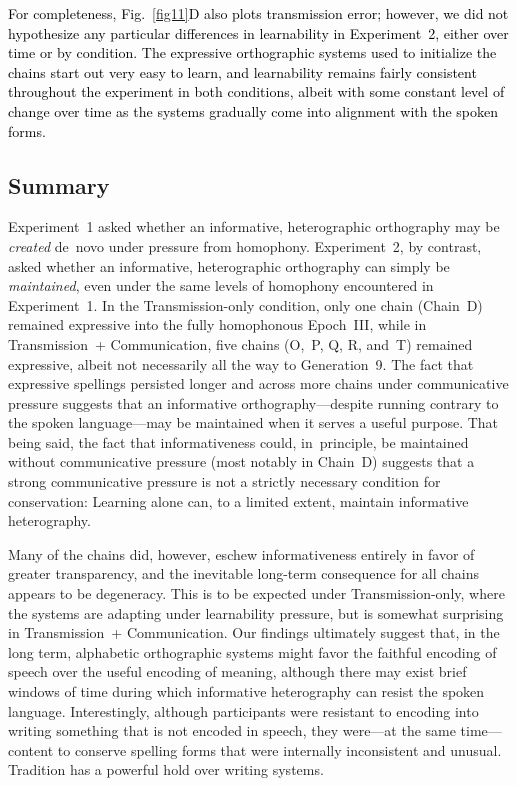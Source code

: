 \documentclass[doc,biblatex]{apa7}
\newcommand\firstrevision[1]{\textcolor{black}{#1}}
\begin{document}
\firstrevision{For completeness, Fig.~\ref{fig11}D also plots transmission error; however, we did not hypothesize any particular differences in learnability in Experiment~2, either over time or by condition. The expressive orthographic systems used to initialize the chains start out very easy to learn, and learnability remains fairly consistent throughout the experiment in both conditions, albeit with some constant level of change over time as the systems gradually come into alignment with the spoken forms.}

\subsection{Summary}

Experiment~1 asked whether an informative, heterographic orthography may be \textit{created} de~novo under pressure from homophony. Experiment~2, by contrast, asked whether an informative, heterographic orthography can simply be \textit{maintained}, even under the same levels of homophony encountered in Experiment~1. In the Transmission-only condition, only one chain (Chain~D) remained expressive into the fully homophonous Epoch~III, while in Transmission~+ Communication, five chains (O,~P, Q, R, and~T) remained expressive, albeit not necessarily all the way to Generation~9. The fact that expressive spellings persisted longer and across more chains under communicative pressure suggests that an informative orthography---despite running contrary to the spoken language---may be maintained when it serves a useful purpose. That being said, the fact that informativeness could, in~principle, be maintained without communicative pressure (most notably in Chain~D) suggests that a strong communicative pressure is not a strictly necessary condition for conservation: Learning alone can, to a limited extent, maintain informative heterography.

Many of the chains did, however, eschew informativeness entirely in favor of greater transparency, and the inevitable long-term consequence for all chains appears to be degeneracy. This is to be expected under Transmission-only, where the systems are adapting under learnability pressure, but is somewhat surprising in Transmission~+ Communication. Our findings ultimately suggest that, in the long term, alphabetic orthographic systems might favor the faithful encoding of speech over the useful encoding of meaning, although there may exist brief windows of time during which informative heterography can resist the spoken language. Interestingly, although participants were resistant to encoding into writing something that is not encoded in speech, they were---at the same time---content to conserve spelling forms that were internally inconsistent and unusual. Tradition has a powerful hold over writing systems.
\end{document}
